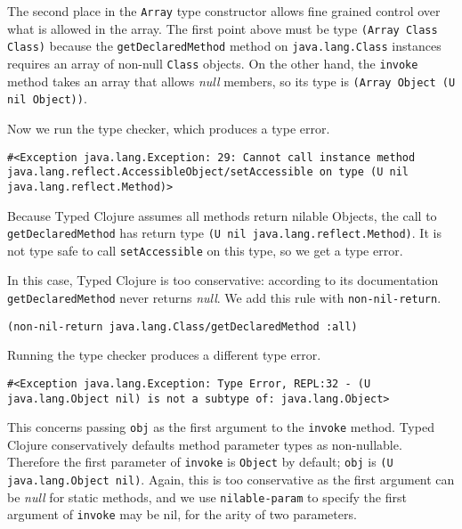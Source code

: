 The second place in the \lstinline|Array| type constructor allows fine grained control over what is allowed
in the array. The first point above must be type \lstinline|(Array Class Class)| because the 
\lstinline|getDeclaredMethod| method on \lstinline|java.lang.Class| instances requires an array of non-null
\lstinline|Class| objects. On the other hand, the \lstinline|invoke| method takes an array that allows
\emph{null} members, so its type is \lstinline|(Array Object (U nil Object))|.

Now we run the type checker, which produces a type error.

\begin{lstlisting}
#<Exception java.lang.Exception: 29: Cannot call instance method java.lang.reflect.AccessibleObject/setAccessible on type (U nil java.lang.reflect.Method)>
\end{lstlisting}

Because Typed Clojure assumes all methods return nilable Objects, the call to \lstinline|getDeclaredMethod|
has return type \lstinline|(U nil java.lang.reflect.Method)|. It is not type safe to call \lstinline|setAccessible|
on this type, so we get a type error.

In this case, Typed Clojure is too conservative: according to its documentation \lstinline|getDeclaredMethod|
never returns \emph{null}. We add this rule with \lstinline|non-nil-return|.

\begin{lstlisting}
(non-nil-return java.lang.Class/getDeclaredMethod :all)
\end{lstlisting}

Running the type checker produces a different type error.

\begin{lstlisting}
#<Exception java.lang.Exception: Type Error, REPL:32 - (U java.lang.Object nil) is not a subtype of: java.lang.Object>
\end{lstlisting}

This concerns passing \lstinline|obj| as the first argument to the \lstinline|invoke| method.
Typed Clojure conservatively defaults method parameter types as non-nullable. 
Therefore the first parameter of \lstinline|invoke| is \lstinline|Object| by default; \lstinline|obj|
is \lstinline|(U java.lang.Object nil)|. Again, this is too conservative as the first argument can
be \emph{null} for static methods, and we use \lstinline|nilable-param| to specify the first argument
of \lstinline|invoke| may be nil, for the arity of two parameters.

